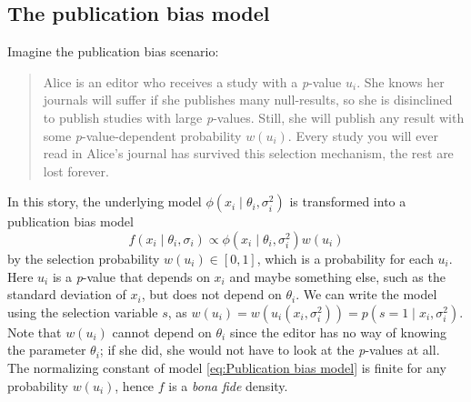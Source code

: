 \documentclass[useAMS,usenatbib,referee]{biom}
\newtheorem{prop}[theorem]{Proposition}
\begin{document}




\subsection{The publication bias model} \label{subsect:publicationBias}

Imagine the publication bias scenario:
\begin{quote}
Alice is an editor who receives a study with a \textit{p}-value $u_i$. She knows her journals will suffer if she publishes many null-results, so she is disinclined to publish studies with large \textit{p}-values. Still, she will publish any result with some \textit{p}-value-dependent probability $w(u_i)$. Every study you will ever read in Alice's journal has survived this selection mechanism, the rest are lost forever.
\end{quote}
In this story, the underlying model $\phi(x_{i}\mid\theta_{i},\sigma^2_{i})$ is transformed into a publication bias model
\vspace{-9mm}
\begin{equation}\label{eq:Publication bias model}
f(x_{i}\mid\theta_{i},\sigma_{i})\propto \phi(x_{i}\mid\theta_{i},\sigma^2_{i})w(u_i)
\end{equation}
by the selection probability $w(u_i) \in [0,1]$, which is a probability for each $u_i$. Here $u_i$ is a \textit{p}-value that depends on $x_{i}$ and maybe something else, such as the standard deviation of $x_{i}$, but does not depend on $\theta_{i}$. We can write the model using the selection variable $s$, as $w(u_i) = w(u_i(x_i, \sigma^2_i)) = p(s=1 \mid x_i, \sigma^2_i)$. Note that $w(u_i)$ cannot depend on $\theta_{i}$ since the editor has no way of knowing the parameter $\theta_{i}$; if she did, she would not have to look at the \textit{p}-values at all. The normalizing constant of model \eqref{eq:Publication bias model} is finite for any probability $w(u_i)$, hence $f$ is a \textit{bona fide} density.
\end{document}

